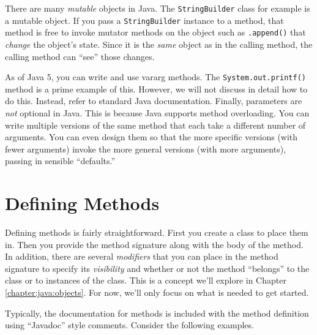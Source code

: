 There are many \emph{mutable} objects in Java.  The 
\texttt{StringBuilder} class for example is a mutable
object.  If you pass a \texttt{StringBuilder} instance
to a method, that method is free to invoke mutator methods 
on the object such as \texttt{.append()} that 
\emph{change} the object's state.  Since
it is the \emph{same} object as in the calling method, the
calling method can ``see'' those changes.

As of Java 5, you can write and use 
vararg methods.  The
\texttt{System.out.printf()} method is a prime
example of this.  However, we will not discuss in detail how
to do this.  Instead, refer to standard Java documentation.
Finally, parameters are \emph{not} optional in Java.  This is because
Java supports method overloading.  You can write multiple
versions of the same method that each take a different
number of arguments.  You can even design them so that
the more specific versions (with fewer arguments) invoke
the more general versions (with more arguments), passing
in sensible ``defaults.''

\section{Defining Methods}

Defining methods is fairly straightforward.  First you create a 
class to place them in.  Then you provide the method signature
along with the body of the method.  In addition, there are 
several \emph{modifiers} that you can place in the method 
signature to specify its 
\emph{visibility} and whether or not
the method ``belongs'' to the class or to instances of the 
class.  This is a concept we'll explore in Chapter \ref{chapter:java:objects}.
For now, we'll only focus on what is needed to get started.

Typically, the documentation for methods is included with 
the method definition using ``Javadoc'' style comments.
Consider the following examples.

